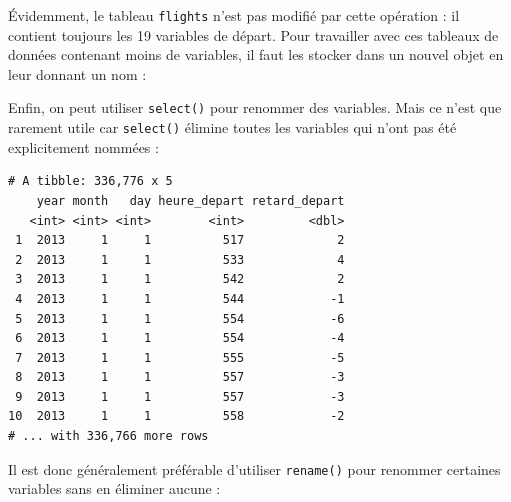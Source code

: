 \documentclass[a4paperpaper,]{article}
\newenvironment{Shaded}{\begin{snugshade}}{\end{snugshade}}
\newcommand{\DataTypeTok}[1]{\textcolor[rgb]{0.00,0.34,0.68}{#1}}
\newcommand{\KeywordTok}[1]{\textcolor[rgb]{0.12,0.11,0.11}{\textbf{#1}}}
\newcommand{\NormalTok}[1]{\textcolor[rgb]{0.12,0.11,0.11}{#1}}
\newcommand{\OperatorTok}[1]{\textcolor[rgb]{0.12,0.11,0.11}{#1}}
\newcommand{\StringTok}[1]{\textcolor[rgb]{0.75,0.01,0.01}{#1}}
\theoremstyle{definition}
\theoremstyle{definition}
\theoremstyle{definition}
\theoremstyle{remark}
\begin{document}
Évidemment, le tableau \texttt{flights} n'est pas modifié par cette
opération : il contient toujours les 19 variables de départ. Pour
travailler avec ces tableaux de données contenant moins de variables, il
faut les stocker dans un nouvel objet en leur donnant un nom :

\begin{Shaded}
\end{Shaded}

Enfin, on peut utiliser \texttt{select()} pour renommer des variables.
Mais ce n'est que rarement utile car \texttt{select()} élimine toutes
les variables qui n'ont pas été explicitement nommées :

\begin{Shaded}
\end{Shaded}

\begin{verbatim}
# A tibble: 336,776 x 5
    year month   day heure_depart retard_depart
   <int> <int> <int>        <int>         <dbl>
 1  2013     1     1          517             2
 2  2013     1     1          533             4
 3  2013     1     1          542             2
 4  2013     1     1          544            -1
 5  2013     1     1          554            -6
 6  2013     1     1          554            -4
 7  2013     1     1          555            -5
 8  2013     1     1          557            -3
 9  2013     1     1          557            -3
10  2013     1     1          558            -2
# ... with 336,766 more rows
\end{verbatim}

Il est donc généralement préférable d'utiliser \texttt{rename()} pour
renommer certaines variables sans en éliminer aucune :

\begin{Shaded}
\end{Shaded}
\end{document}
